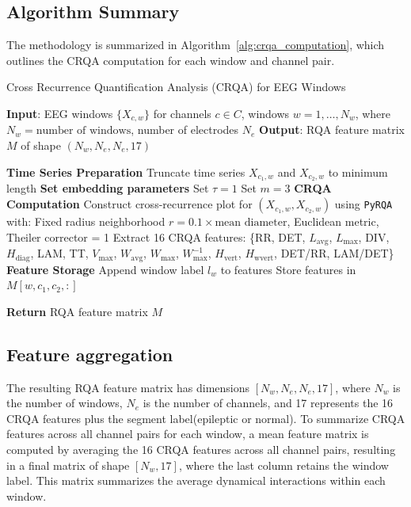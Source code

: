 \documentclass{article}
\begin{document}
				\subsection{Algorithm Summary}
				\label{subsec:algorithm}

				The methodology is summarized in Algorithm~\ref{alg:crqa_computation}, which outlines the CRQA computation for each window and channel pair.

				\begin{algorithm}
				\caption{Cross Recurrence Quantification Analysis (CRQA) for EEG Windows}
				\label{alg:crqa_computation}
				\begin{algorithmic}[1]
				\State \textbf{Input}: EEG windows \( \{X_{c,w}\} \) for channels \( c \in C \), windows \( w = 1, \dots, N_w \), where \( N_w = \text{number of windows} \), number of electrodes \( N_e \)
				\State \textbf{Output}: RQA feature matrix \( M \) of shape \( (N_w, N_e, N_e, 17) \)

					\State \textbf{Time Series Preparation}
					\State Truncate time series \( X_{c_1,w} \) and \( X_{c_2,w} \) to minimum length
					\State \textbf{Set embedding parameters}
					\State Set \( \tau = 1 \)
					\State Set \( m = 3 \)
					\State \textbf{CRQA Computation}
					\State Construct cross-recurrence plot for \( (X_{c_1,w}, X_{c_2,w}) \) using \texttt{PyRQA} with:
					\State \quad Fixed radius neighborhood \( r = 0.1 \times \text{mean diameter} \), Euclidean metric, Theiler corrector = 1
					\State Extract 16 CRQA features: \{RR, DET, \( L_{\text{avg}} \), \( L_{\text{max}} \), DIV, \( H_{\text{diag}} \), LAM, TT, \( V_{\text{max}} \), \( W_{\text{avg}} \), \( W_{\text{max}} \), \( W_{\text{max}}^{-1} \), \( H_{\text{vert}} \), \( H_{\text{wvert}} \), DET/RR, LAM/DET\}
					\State \textbf{Feature Storage}
					\State Append window label \( l_w \) to features
					\State Store features in \( M[w, c_1, c_2, :] \)
				    \EndFor
				\EndFor

				\State \textbf{Return} RQA feature matrix \( M \)
				\end{algorithmic}
				\end{algorithm}

				 \subsection{Feature aggregation}
				 \label{subsec:feature_aggregation}
				 The resulting RQA feature matrix has dimensions \([N_w, N_e, N_e, 17]\), where \(N_w\) is the number of windows, 
				\(N_e\) is the number of channels, and 17 represents the 16 CRQA features plus the segment label(epileptic or normal). 
				 To summarize CRQA features across all channel pairs for each window, 
				 a mean feature matrix is computed by averaging the 16 CRQA features across all channel pairs, 
				 resulting in a final matrix of shape \([N_w, 17]\), where the last column retains the window label. 
				 This matrix summarizes the average dynamical interactions within each window.


	
			\newpage




\end{document}
